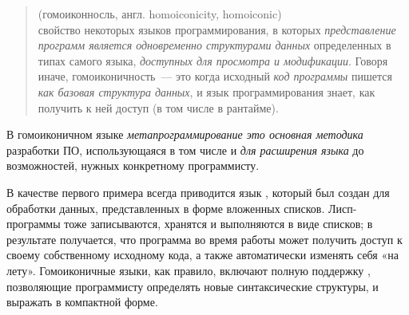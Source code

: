 {}\label{homoiconic}

\begin{quotation}\noindent
{} (гомоиконносль, англ. homoiconicity, homoiconic)\\
свойство некоторых языков программирования, в которых \emph{представление
программ является одновременно структурами данных} определенных в типах самого
языка, \emph{доступных для просмотра и модификации}. Говоря иначе,
гомоиконичность\ --- это когда исходный \textit{код программы} пишется
\textit{как базовая структура данных}, и язык программирования знает, как
получить к ней доступ (в том числе в рантайме).
\end{quotation}

\noindent
В гомоиконичном языке \textit{метапрограммирование это основная методика}
разработки ПО, использующаяся в том числе и \textit{для расширения языка} до
возможностей, нужных конкретному программисту.

В качестве первого примера всегда приводится язык \lisp, который был создан для
обработки данных, представленных в форме вложенных списков.
Лисп-программы тоже записываются, хранятся и выполняются в виде списков; в
результате получается, что программа во время работы может получить доступ к
своему собственному исходному кода, а также автоматически изменять себя «на
лету». Гомоиконичные языки, как правило, включают полную поддержку
, позволяющие программисту определять новые
синтаксические структуры, и выражать  в компактной
форме.

